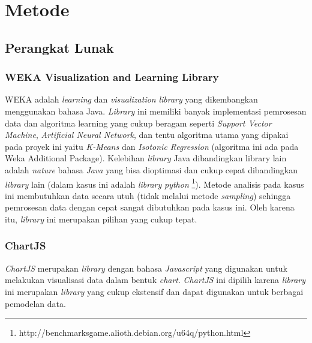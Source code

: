 \documentclass{article}
\begin{document}
\section{Metode}

\subsection{Perangkat Lunak}

\subsubsection{WEKA Visualization and Learning Library}
\begin{adjustwidth}{4em}{0pt}

\hspace{\parindent}WEKA adalah \textit{learning} dan \textit{visualization} \textit{library} yang dikembangkan menggunakan bahasa Java. \textit{Library} ini memiliki banyak implementasi pemrosesan data dan algoritma learning yang cukup beragam seperti \textit{Support Vector Machine}, \textit{Artificial Neural Network}, dan tentu algoritma utama yang dipakai pada proyek ini yaitu \textit{K-Means} dan \textit{Isotonic Regression} (algoritma ini ada pada Weka Additional Package). Kelebihan \textit{library} Java dibandingkan library lain adalah \textit{nature} bahasa \textit{Java} yang bisa dioptimasi dan cukup cepat dibandingkan \textit{library} lain (dalam kasus ini adalah \textit{library} \textit{python} \footnote{http://benchmarksgame.alioth.debian.org/u64q/python.html}). Metode analisis pada kasus ini membutuhkan data secara utuh (tidak melalui metode \textit{sampling}) sehingga pemrosesan data dengan cepat sangat dibutuhkan pada kasus ini. Oleh karena itu, \textit{library} ini merupakan pilihan yang cukup tepat.

\end{adjustwidth}

\subsubsection{ChartJS}
\begin{adjustwidth}{4em}{0pt}
	
\hspace{\parindent}\textit{ChartJS} merupakan \textit{library} dengan bahasa \textit{Javascript} yang digunakan untuk melakukan visualisasi data dalam bentuk \textit{chart}. \textit{ChartJS} ini dipilih karena \textit{library} ini merupakan \textit{library} yang cukup ekstensif dan dapat digunakan untuk berbagai pemodelan data.

\end{adjustwidth}
\end{document}
